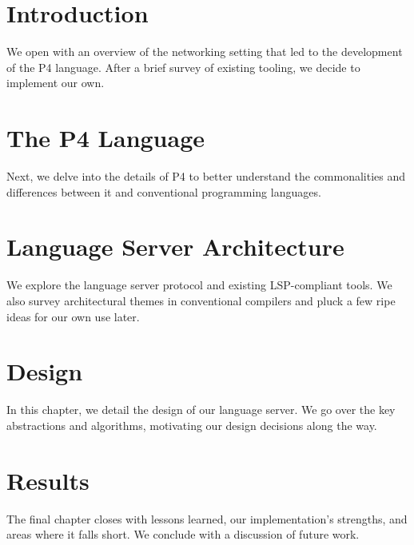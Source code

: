 \documentclass[english,master,unicode]{ctufit-thesis}
\theoremstyle{plain}
\theoremstyle{definition}
\theoremstyle{remark}
\numberwithin{theorem}{chapter}
\begin{document}
\begin{summarypage}
\section*{Introduction}

We open with an overview of the networking setting that led to the development
of the P4 language. After a brief survey of existing tooling, we decide to
implement our own.

\section*{The P4 Language}

Next, we delve into the details of P4 to better understand the commonalities and
differences between it and conventional programming languages.

\section*{Language Server Architecture}

We explore the language server protocol and existing LSP-compliant tools. We
also survey architectural themes in conventional compilers and pluck a few ripe
ideas for our own use later.

\section*{Design}

In this chapter, we detail the design of our language server. We go over the key
abstractions and algorithms, motivating our design decisions along the way.

\section*{Results}

The final chapter closes with lessons learned, our implementation's strengths,
and areas where it falls short. We conclude with a discussion of future work.

\end{summarypage}

\end{document}
